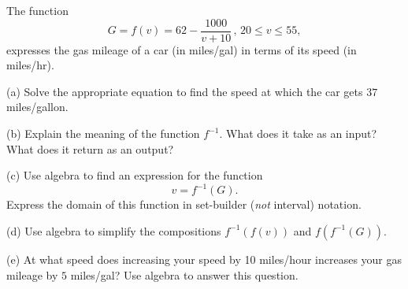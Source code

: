 \documentclass{ximera}
\begin{document}
\begin{example}  \label{Ex:oodfdsfo}
The function
\[
   G = f(v) = 62 - \frac{1000}{v+10}\,  , \, 20\leq v \leq 55 ,
\]
expresses the gas mileage of a car (in  miles/gal) in terms of its speed (in miles/hr). 

(a) Solve the appropriate equation to find the speed at which the car gets $37$ miles/gallon.

(b) Explain the meaning of the function $f^{-1}$. What does it take as an input? What does it return as an output?

(c) Use algebra to find an expression for the function 
\[
    v = f^{-1}(G).
\]
Express the domain of this function in set-builder (\emph{not} interval) notation.

(d) Use algebra to simplify the compositions $f^{-1}(f(v))$ and $f(f^{-1}(G))$. 
  
(e) At what speed does increasing your speed by 10 miles/hour increases  your gas mileage by $5$ miles/gal? Use algebra to answer this question.


\end{example}
\end{document}
